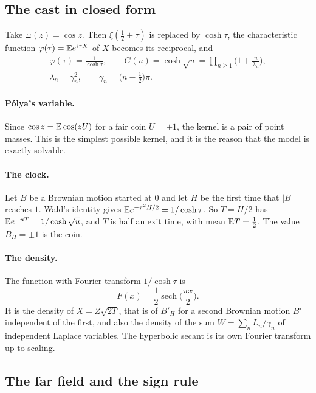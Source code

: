 \subsection{The cast in closed form}

Take $\Xi(z)=\cos z$. Then $\xi(\frac12+\tau)$ is replaced by $\cosh\tau$, the characteristic function $\varphi(\tau)=\mathbb{E} e^{i\tau X}$ of $X$ becomes its reciprocal, and
\begin{gather*}
\varphi(\tau)=\frac{1}{\cosh\tau},\qquad G(u)=\cosh\sqrt{u}=\prod_{n\ge1}\Big(1+\frac{u}{\lambda_n}\Big),\\
\lambda_n=\gamma_n^2,\qquad\gamma_n=\Big(n-\frac12\Big)\pi .
\end{gather*}

\paragraph{P\'olya's variable.} Since $\cos z=\mathbb{E}\cos(zU)$ for a fair coin $U=\pm1$, the kernel is a pair of point masses. This is the simplest possible kernel, and it is the reason that the model is exactly solvable.

\paragraph{The clock.} Let $B$ be a Brownian motion started at $0$ and let $H$ be the first time that $|B|$ reaches $1$. Wald's identity gives $\mathbb{E} e^{-\tau^2H/2}=1/\cosh\tau$. So $T=H/2$ has $\mathbb{E} e^{-uT}=1/\cosh\sqrt u$, and $T$ is half an exit time, with mean $\mathbb{E} T=\frac12$. The value $B_H=\pm1$ is the coin.

\paragraph{The density.} The function with Fourier transform $1/\cosh\tau$ is
\begin{equation}\label{e:eq:sech}
F(x)=\frac12\operatorname{sech}\Big(\frac{\pi x}{2}\Big).
\end{equation}
It is the density of $X=Z\sqrt{2T}$, that is of $B'_H$ for a second Brownian motion $B'$ independent of the first, and also the density of the sum $W=\sum_nL_n/\gamma_n$ of independent Laplace variables. The hyperbolic secant is its own Fourier transform up to scaling.

\subsection{The far field and the sign rule}

